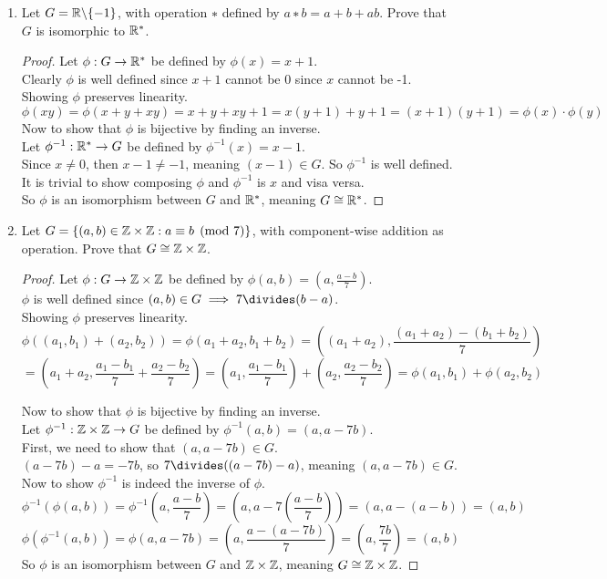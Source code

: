 \documentclass[12pt]{article}
\begin{document}
\begin{enumerate}
		\item Let $G = \mathbb{R}\backslash\{-1\}$, with operation $∗$ defined by $a∗b = a+b+ab$. Prove that $G$ is isomorphic to $\mathbb{R}^*$.
		\begin{proof}
			Let $\phi:G\rightarrow\mathbb{R}^*$ be defined by $\phi(x)=x+1$.\\
			Clearly $\phi$ is well defined since $x+1$ cannot be 0 since $x$ cannot be -1.\\
			Showing $\phi$ preserves linearity.\\
			\[\phi(xy) = \phi(x+y+xy) = x+y+xy+1 = x(y+1)+y+1 = (x+1)(y+1) = \phi(x)\cdot\phi(y)\]
			Now to show that $\phi$ is bijective by finding an inverse.\\
			Let $\phi^{-1}:\mathbb{R}^*\rightarrow G$ be defined by $\phi^{-1}(x) = x-1$.\\
			Since $x\neq0$, then $x-1\neq-1$, meaning $(x-1)\in G$. So $\phi^{-1}$ is well defined.\\
			It is trivial to show composing $\phi$ and $\phi^{-1}$ is $x$ and visa versa.\\
			So $\phi$ is an isomorphism between $G$ and $\mathbb{R}^*$, meaning $G \cong \mathbb{R}^*$.
		\end{proof}
		
		\item Let $G = \{(a, b) \in \mathbb{Z}\times\mathbb{Z} : a \equiv b\pmod7\}$, with component-wise addition as operation. Prove that $G \cong \mathbb{Z}\times\mathbb{Z}$.
		\begin{proof}
			Let $\phi:G\rightarrow\mathbb{Z}\times\mathbb{Z}$ be defined by $\phi(a,b) = (a,\frac{a-b}{7})$.\\
			$\phi$ is well defined since $(a,b)\in G \implies 7\divides (b-a)$.\\
			Showing $\phi$ preserves linearity.\\
			\[\phi((a_1,b_1)+(a_2,b_2)) = \phi(a_1+a_2,b_1+b_2) = \left((a_1+a_2),\frac{(a_1+a_2)-(b_1+b_2)}{7}\right)\]
			\[= \left(a_1+a_2,\frac{a_1-b_1}{7}+\frac{a_2-b_2}{7}\right) = \left(a_1,\frac{a_1-b_1}{7}\right) + \left(a_2,\frac{a_2-b_2}{7}\right) = \phi(a_1,b_1)+\phi(a_2,b_2)\]
			
			Now to show that $\phi$ is bijective by finding an inverse.\\
			Let $\phi^{-1}:\mathbb{Z}\times\mathbb{Z}\rightarrow G$ be defined by $\phi^{-1}(a,b) = (a,a-7b)$.\\
			First, we need to show that $(a,a-7b)\in G$.\\
			$(a-7b) - a = -7b$, so $7 \divides ((a-7b)-a)$, meaning $(a,a-7b)\in G$.\\
			Now to show $\phi^{-1}$ is indeed the inverse of $\phi$.
			$$\phi^{-1}(\phi(a,b)) = \phi^{-1}\left(a,\frac{a-b}{7}\right) = \left(a,a-7\left(\frac{a-b}{7}\right)\right) = (a,a-(a-b)) = (a,b)$$
			$$\phi(\phi^{-1}(a,b)) = \phi(a,a-7b) = \left(a,\frac{a-(a-7b)}{7}\right) = \left(a,\frac{7b}{7}\right) = (a,b)$$
			So $\phi$ is an isomorphism between $G$ and $\mathbb{Z}\times\mathbb{Z}$, meaning $G \cong \mathbb{Z}\times\mathbb{Z}$.
		\end{proof}
	\end{enumerate}
\end{document}
